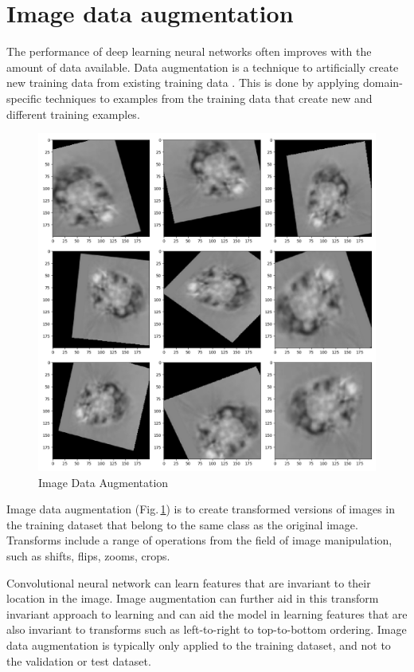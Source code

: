 \section{Image data augmentation}

The performance of deep learning neural networks often improves with the amount of data available. Data augmentation is a technique to artificially create new training data from existing training data \citep{Mikolajczyk2018}. This is done by applying domain-specific techniques to examples from the training data that create new and different training examples.

\begin{figure}[h]
	\centering
	\includegraphics[width=.5\textwidth]{Figs/dataaug.jpg}
    \caption{Image Data Augmentation}
    \label{dataaug}
\end{figure}

Image data augmentation (Fig.\,\ref{dataaug}) is to create transformed versions of images in the training dataset that belong to the same class as the original image. Transforms include a range of operations from the field of image manipulation, such as shifts, flips, zooms, crops.

Convolutional neural network can learn features that are invariant to their location in the image. Image augmentation can further aid in this transform invariant approach to learning and can aid the model in learning features that are also invariant to transforms such as left-to-right to top-to-bottom ordering. Image data augmentation is typically only applied to the training dataset, and not to the validation or test dataset. 



